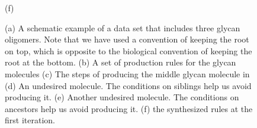 \begin{figure}[h!]
\begin{minipage}{0.45\linewidth}
    (f)
  \end{minipage}

  \caption{(a) A schematic example of a data set that includes three glycan oligomers. Note that we have used a convention of keeping the root on top, which is opposite to the biological convention of keeping the root at the bottom. (b) A set of production rules for the glycan molecules (c) The steps of producing the middle glycan molecule in (d) An undesired molecule. The conditions on siblings help us avoid producing it. (e) Another undesired molecule.
    The conditions on ancestors help us avoid producing it.  (f) the synthesized rules at the first iteration.}
  \label{fig:ex-gly}
\end{figure}

